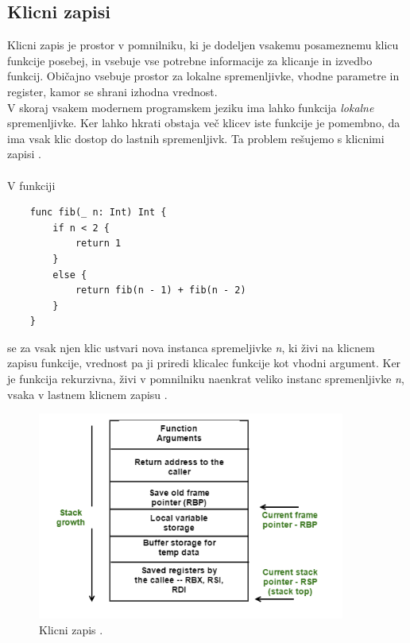 \documentclass[a4paper, 12p]{book}
\begin{document}
\subsection{Klicni zapisi}

Klicni zapis je prostor v pomnilniku, ki je dodeljen vsakemu posameznemu klicu funkcije posebej, in vsebuje vse potrebne informacije za klicanje in izvedbo funkcij. Običajno vsebuje prostor za lokalne spremenljivke, vhodne parametre in register, kamor se shrani izhodna vrednost. \\
\indent V skoraj vsakem modernem programskem jeziku ima lahko funkcija \textit{lokalne} spremenljivke. Ker lahko hkrati obstaja več klicev iste funkcije je pomembno, da ima vsak klic dostop do lastnih spremenljivk. Ta problem rešujemo s klicnimi zapisi \cite{modernCompiler}.  \\\\
\indent V funkciji 

\renewcommand{\lstlistingname}{Program}
\begin{lstlisting}
	func fib(_ n: Int) Int {
	    if n < 2 {
	        return 1
	    }
	    else {
	        return fib(n - 1) + fib(n - 2)
	    }
	}
\end{lstlisting}

se za vsak njen klic ustvari nova instanca spremeljivke \textit{n}, ki živi na klicnem zapisu funkcije, vrednost pa ji priredi klicalec funkcije kot vhodni argument. Ker je funkcija rekurzivna, živi v pomnilniku naenkrat veliko instanc spremenljivke \textit{n}, vsaka v lastnem klicnem zapisu \cite{modernCompiler}.

\begin{figure}[h]
	\begin{center}
		\includegraphics[width=0.9\textwidth]{resources/stackFrame.png}
	\end{center}
	\caption{Klicni zapis \cite{stackFrames}.}
	\label{image:stackFramesImg}
\end{figure}
\end{document}
